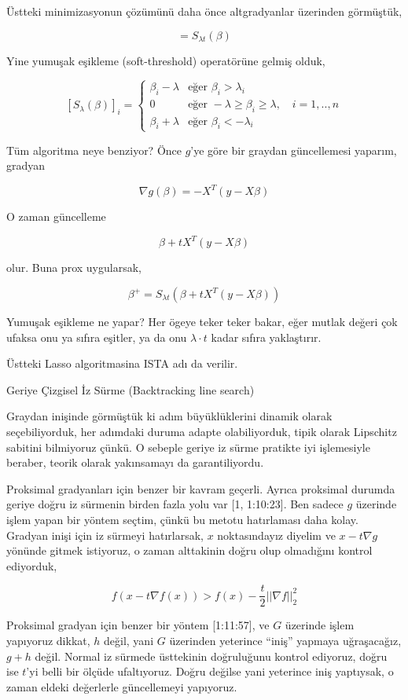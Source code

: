 \documentclass[12pt,fleqn]{article}\usepackage{../../common}
\begin{document}
Üstteki minimizasyonun çözümünü daha önce altgradyanlar üzerinden
görmüştük, 

$$
= S_{\lambda t}(\beta)
$$

Yine yumuşak eşikleme (soft-threshold) operatörüne gelmiş olduk, 

$$
[ S_{\lambda} (\beta) ]_i = 
\left\{ \begin{array}{ll}
\beta_i - \lambda & \textrm{eğer } \beta_i > \lambda_i \\
0 & \textrm{eğer } -\lambda \ge \beta_i \ge \lambda, \quad i=1,..,n \\
\beta_i + \lambda & \textrm{eğer } \beta_i < -\lambda_i 
\end{array} \right.
$$

Tüm algoritma neye benziyor? Önce $g$'ye göre bir graydan güncellemesi
yaparım, gradyan

$$
\nabla g(\beta) = -X^T (y-X\beta)
$$

O zaman güncelleme 

$$\beta + t X^T (y-X\beta)$$ 

olur. Buna prox uygularsak,

$$
\beta^+ = S_{\lambda t}(\beta + t X^T (y-X\beta))
$$

Yumuşak eşikleme ne yapar? Her ögeye teker teker bakar, eğer mutlak değeri
çok ufaksa onu ya sıfıra eşitler, ya da onu $\lambda \cdot t$ kadar sıfıra
yaklaştırır. 

Üstteki Lasso algoritmasina ISTA adı da verilir. 

Geriye Çizgisel İz Sürme  (Backtracking line search)

Graydan inişinde görmüştük ki adım büyüklüklerini dinamik olarak
seçebiliyorduk, her adımdaki duruma adapte olabiliyorduk, tipik olarak
Lipschitz sabitini bilmiyoruz çünkü. O sebeple geriye iz sürme pratikte
iyi işlemesiyle beraber, teorik olarak yakınsamayı da garantiliyordu. 

Proksimal gradyanları için benzer bir kavram geçerli. Ayrıca proksimal
durumda geriye doğru iz sürmenin birden fazla yolu var [1, 1:10:23]. Ben
sadece $g$ üzerinde işlem yapan bir yöntem seçtim, çünkü bu metotu
hatırlaması daha kolay. Gradyan inişi için iz sürmeyi hatırlarsak, $x$
noktasındayız diyelim ve $x-t \nabla g$ yönünde gitmek istiyoruz, o zaman
alttakinin doğru olup olmadığını kontrol ediyorduk, 

$$
f(x - t\nabla f(x) ) > f(x) - \frac{t}{2} ||\nabla f||_2^2 
$$

Proksimal gradyan için benzer bir yöntem [1:11:57], ve $G$ üzerinde işlem
yapıyoruz dikkat, $h$ değil, yani $G$ üzerinden yeterince ``iniş'' yapmaya
uğraşacağız, $g+h$ değil. Normal iz sürmede üsttekinin doğruluğunu kontrol
ediyoruz, doğru ise $t$'yi belli bir ölçüde ufaltıyoruz. Doğru değilse yani
yeterince iniş yaptıysak, o zaman eldeki değerlerle güncellemeyi yapıyoruz.
\end{document}
